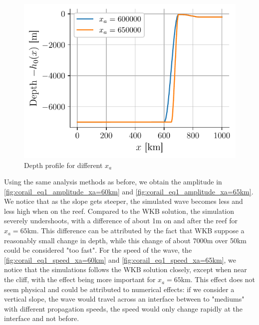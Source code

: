 \begin{figure}[h]
    \centering
    \includegraphics[width=0.6\linewidth]{figures/corail_eq1_depth_var_xa.pdf}
    \caption{Depth profile for different \(x_a\)}
    \label{fig:corail_eq1_depth_xa}
\end{figure}

Using the same analysis methods as before, we obtain the amplitude in \autoref{fig:corail_eq1_amplitude_xa=60km} and \autoref{fig:corail_eq1_amplitude_xa=65km}. We notice that as the slope gets steeper, the simulated wave becomes less and less high when on the reef. Compared to the WKB solution, the simulation severely undershoots, with a difference of about 1m on and after the reef for \(x_a = 65\)km. This difference can be attributed by the fact that WKB suppose a reasonably small change in depth, while this change of about 7000m over 50km could be considered "too fast". For the speed of the wave, the \autoref{fig:corail_eq1_speed_xa=60km} and \autoref{fig:corail_eq1_speed_xa=65km}, we notice that the simulations follows the WKB solution closely, except when near the cliff, with the effect being more important for \(x_a = 65\)km. This effect does not seem physical and could be attributed to numerical effects: if we consider a vertical slope, the wave would travel across an interface between to "mediums" with different propagation speeds, the speed would only change rapidly at the interface and not before.

